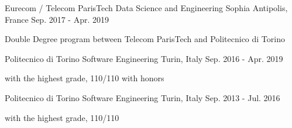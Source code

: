 

\begin{cventries}

  \cventry
    {Eurecom / Telecom ParisTech} %
    { Data Science and Engineering} %
    {Sophia Antipolis, France} %
    {Sep. 2017 - Apr. 2019} %
    {
      \begin{cvitems} %
        \item {Double Degree program between Telecom ParisTech and Politecnico di Torino}
      \end{cvitems}
    }
  
  \cventry
    {Politecnico di Torino}
    { Software Engineering}
    {Turin, Italy}
    {Sep. 2016 - Apr. 2019}
    {
      \begin{cvitems}
        \item {with the highest grade, \textsc{110/110} with honors}
      \end{cvitems}
    }
  
  \cventry
    {Politecnico di Torino}
    { Software Engineering}
    {Turin, Italy}
    {Sep. 2013 - Jul. 2016}
    {
      \begin{cvitems}
        \item {with the highest grade, \textsc{110/110}}
      \end{cvitems}
    }

\end{cventries}
